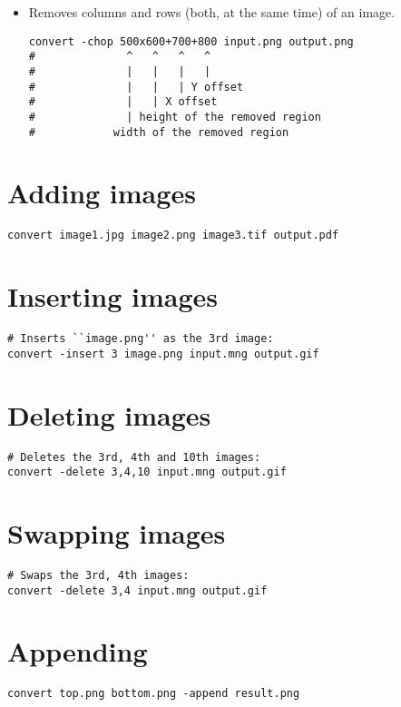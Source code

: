 \begin{itemize}
\item Removes columns and rows (both, at the same time) of an image.
\begin{lstlisting}
convert -chop 500x600+700+800 input.png output.png
#              ^   ^   ^   ^
#              |   |   |   |
#              |   |   | Y offset
#              |   | X offset
#              | height of the removed region
#            width of the removed region
\end{lstlisting}

\end{itemize}


\section{Adding images}

\begin{lstlisting}
convert image1.jpg image2.png image3.tif output.pdf
\end{lstlisting}


\section{Inserting images}

\begin{lstlisting}
# Inserts ``image.png'' as the 3rd image:
convert -insert 3 image.png input.mng output.gif
\end{lstlisting}


\section{Deleting images}

\begin{lstlisting}
# Deletes the 3rd, 4th and 10th images:
convert -delete 3,4,10 input.mng output.gif
\end{lstlisting}


\section{Swapping images}

\begin{lstlisting}
# Swaps the 3rd, 4th images:
convert -delete 3,4 input.mng output.gif
\end{lstlisting}


\section{Appending}

\begin{lstlisting}
convert top.png bottom.png -append result.png
\end{lstlisting}


